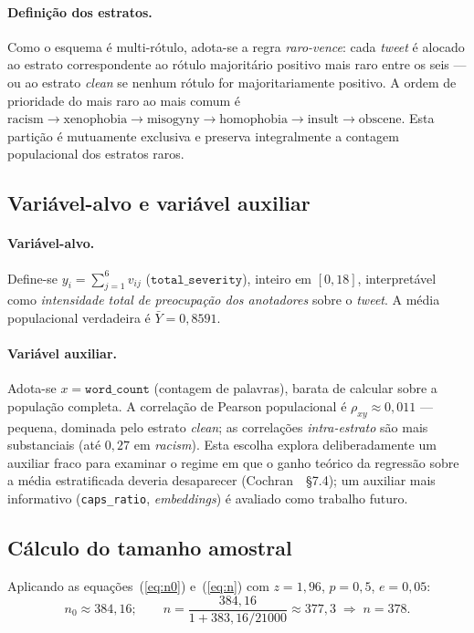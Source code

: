 \paragraph{Definição dos estratos.} Como o esquema é multi-rótulo, adota-se a
regra \textit{raro-vence}: cada \textit{tweet} é alocado ao estrato
correspondente ao rótulo majoritário positivo mais raro entre os seis ---
ou ao estrato \textit{clean} se nenhum rótulo for majoritariamente positivo.
A ordem de prioridade do mais raro ao mais comum é
$\text{racism} \to \text{xenophobia} \to \text{misogyny} \to \text{homophobia}
\to \text{insult} \to \text{obscene}$. Esta partição é mutuamente exclusiva e
preserva integralmente a contagem populacional dos estratos raros.

\subsection{Variável-alvo e variável auxiliar}

\paragraph{Variável-alvo.} Define-se
$y_i = \sum_{j=1}^{6} v_{ij}$ ($\texttt{total\_severity}$), inteiro em
$[0, 18]$, interpretável como \textit{intensidade total de preocupação dos
anotadores} sobre o \textit{tweet}. A média populacional verdadeira é
$\bar{Y} = 0{,}8591$.

\paragraph{Variável auxiliar.} Adota-se $x = \texttt{word\_count}$ (contagem
de palavras), barata de calcular sobre a população completa. A correlação de
Pearson populacional é $\rho_{xy} \approx 0{,}011$ --- pequena, dominada pelo
estrato \textit{clean}; as correlações \emph{intra-estrato} são mais
substanciais (até $0{,}27$ em \textit{racism}). Esta escolha explora
deliberadamente um auxiliar fraco para examinar o regime em que o ganho
teórico da regressão sobre a média estratificada deveria desaparecer
(Cochran~\cite{cochran1977}~§7.4); um auxiliar mais informativo
(\texttt{caps\_ratio}, \textit{embeddings}) é avaliado como trabalho futuro.

\subsection{Cálculo do tamanho amostral}

Aplicando as equações~(\ref{eq:n0}) e~(\ref{eq:n}) com $z=1{,}96$, $p=0{,}5$,
$e=0{,}05$:
\begin{equation*}
  n_0 \approx 384{,}16; \qquad n = \frac{384{,}16}{1 + 383{,}16/21000}
            \approx 377{,}3 \;\Rightarrow\; n = 378.
\end{equation*}

